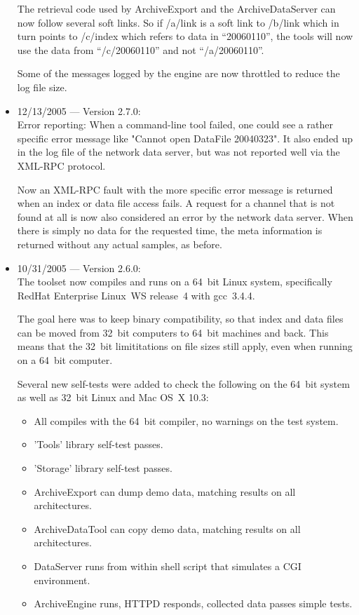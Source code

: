 \begin{itemize}
The retrieval code used by ArchiveExport and the ArchiveDataServer can
now follow several soft links. So if /a/link is a soft link to /b/link
which in turn points to /c/index which refers to data in
``20060110'', the tools will now use the data from 
``/c/20060110'' and not ``/a/20060110''.

Some of the messages logged by the engine are now throttled
to reduce the log file size.

\item 12/13/2005 --- Version 2.7.0:\\
Error reporting: When a command-line tool failed,
one could see a rather specific error message
like "Cannot open DataFile 20040323".
It also ended up in the log file of the network
data server, but was not reported well via
the XML-RPC protocol.

Now an XML-RPC fault with the more specific error
message is returned when an index or data file
access fails.
A request for a channel that is not found at all is now
also considered an error by the network data server.
When there is simply no data for the requested time,
the meta information is returned without any
actual samples, as before.

\item 10/31/2005 --- Version 2.6.0:\\
The toolset now compiles and runs on a 64~bit Linux system,
specifically RedHat Enterprise Linux~WS release~4
with gcc~3.4.4.

The goal here was to keep binary compatibility,
so that index and data files can be moved from
32~bit computers to 64~bit machines and back.
This means that the 32~bit limititations on
file sizes still apply, even when running
on a 64~bit computer.

Several new self-tests were added to check
the following on the 64~bit system as well
as 32~bit Linux and Mac OS~X 10.3:
\begin{itemize}
\item All compiles with the 64~bit compiler, no warnings on the test system.
\item 'Tools' library self-test passes.
\item 'Storage' library self-test passes.
\item ArchiveExport can dump demo data,
      matching results on all architectures.
\item ArchiveDataTool can copy demo data,
      matching results on all architectures.
\item DataServer runs from within shell script
      that simulates a CGI environment.
\item ArchiveEngine runs, HTTPD responds,
      collected data passes simple tests.
\end{itemize}


\end{itemize}
